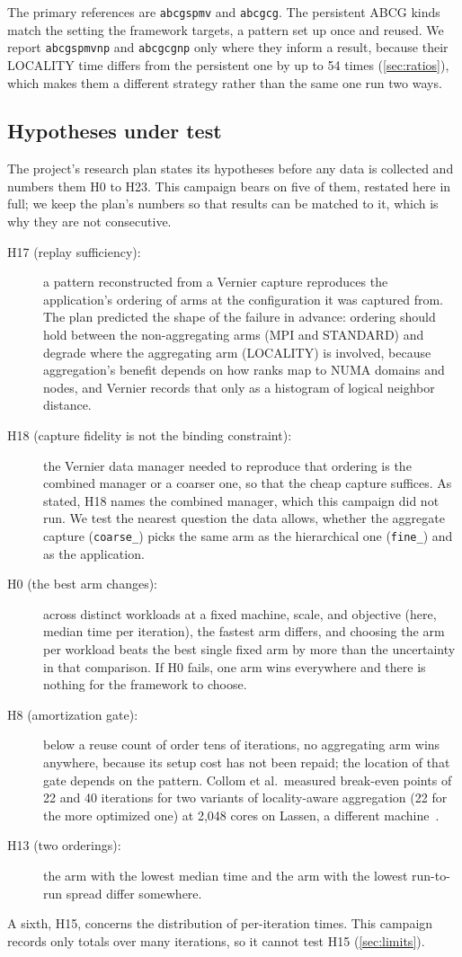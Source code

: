 \documentclass[11pt]{article}
\newcommand{\kF}{\texttt{fine\_}}
\newcommand{\kC}{\texttt{coarse\_}}
\newcommand{\spmv}{\texttt{abcgspmv}}
\newcommand{\cg}{\texttt{abcgcg}}
\newcommand{\spmvnp}{\texttt{abcgspmvnp}}
\newcommand{\cgnp}{\texttt{abcgcgnp}}
\begin{document}
The primary references are \spmv{} and \cg. The persistent ABCG kinds match the setting
the framework targets, a pattern set up once and reused. We report \spmvnp{} and \cgnp{}
only where they inform a result, because their LOCALITY time differs from the persistent
one by up to 54 times (\cref{sec:ratios}), which makes them a different strategy rather
than the same one run two ways.

\subsection{Hypotheses under test}

The project's research plan states its hypotheses before any data is collected and numbers
them H0 to H23. This campaign bears on five of them, restated here in full; we keep the
plan's numbers so that results can be matched to it, which is why they are not
consecutive.
\begin{description}
\item[H17 (replay sufficiency):] a pattern reconstructed from a Vernier capture reproduces
the application's ordering of arms at the configuration it was captured from. The plan
predicted the shape of the failure in advance: ordering should hold between the
non-aggregating arms (MPI and STANDARD) and degrade where the aggregating arm (LOCALITY) is
involved, because aggregation's benefit depends on how ranks map to NUMA domains and nodes,
and Vernier records that only as a histogram of logical neighbor distance.
\item[H18 (capture fidelity is not the binding constraint):] the Vernier data manager needed
to reproduce that ordering is the combined manager or a coarser one, so that the cheap
capture suffices. As stated, H18 names the combined manager, which this campaign did not
run. We test the nearest question the data allows, whether the aggregate capture (\kC)
picks the same arm as the hierarchical one (\kF) and as the application.
\item[H0 (the best arm changes):] across distinct workloads at a fixed machine, scale, and
objective (here, median time per iteration), the fastest arm differs, and choosing the arm per workload beats the best single
fixed arm by more than the uncertainty in that comparison. If H0 fails, one arm wins
everywhere and there is nothing for the framework to choose.
\item[H8 (amortization gate):] below a reuse count of order tens of iterations, no
aggregating arm wins anywhere, because its setup cost has not been repaid; the location of
that gate depends on the pattern. Collom et al.\ measured break-even points of 22 and 40
iterations for two variants of locality-aware aggregation (22 for the more optimized one)
at 2,048 cores on Lassen, a different machine~\cite{collom2023}.
\item[H13 (two orderings):] the arm with the lowest median time and the arm with the lowest
run-to-run spread differ somewhere.
\end{description}
A sixth, H15, concerns the distribution of per-iteration times. This campaign records only
totals over many iterations, so it cannot test H15 (\cref{sec:limits}).
\end{document}
